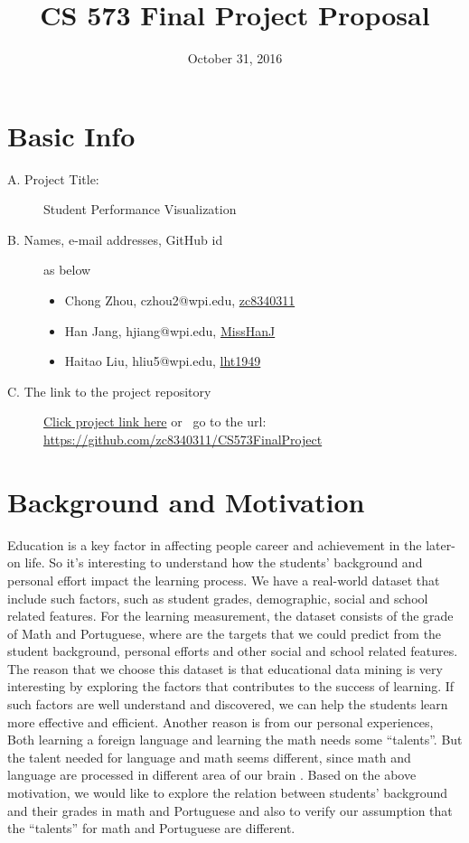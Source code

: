 \documentclass{article}
\begin{document}
\title{CS 573 Final Project Proposal} 
\date{October 31, 2016}
\maketitle
\section{Basic Info}
\begin{description}
\item[A. Project Title:] Student Performance Visualization
\item[B. Names, e-mail addresses, GitHub id] as below 
\begin{itemize}
\item Chong Zhou,  czhou2@wpi.edu, \href{https://github.com/zc8340311}{zc8340311}
\item Han  Jang,   hjiang@wpi.edu, \href{https://github.com/MissHanJ}{MissHanJ}
\item Haitao  Liu,  hliu5@wpi.edu, \href{https://github.com/lht1949}{lht1949}
\end{itemize}
\item[C. The link to the project repository] \href{https://github.com/zc8340311/CS573FinalProject}{Click project link here} or \
go to the url: \url{https://github.com/zc8340311/CS573FinalProject}
\end{description}

\section{Background and Motivation}
Education is a key factor in affecting people career and achievement in the later-on life. So it's interesting to understand how the students' background and personal effort impact the learning process. We have a real-world dataset that include such factors, such as student grades, demographic, social and school related features. For the learning measurement, the dataset consists of the grade of Math and Portuguese, where are the targets that we could predict from the student background, personal efforts and other social and school related features. The reason that we choose this dataset is that educational data mining is very interesting by exploring the factors that contributes to the success of learning. If such factors are well understand and discovered, we can help the students learn more effective and efficient. Another reason is from our personal experiences, Both learning a foreign language and learning the math needs some ``talents''. But the talent needed for language and math seems different, since math and language are processed in different area of our brain . Based on the above motivation, we would like to explore the relation between students' background and their grades in math and Portuguese and also to verify our assumption that the ``talents'' for math and Portuguese are different.
\end{document}
